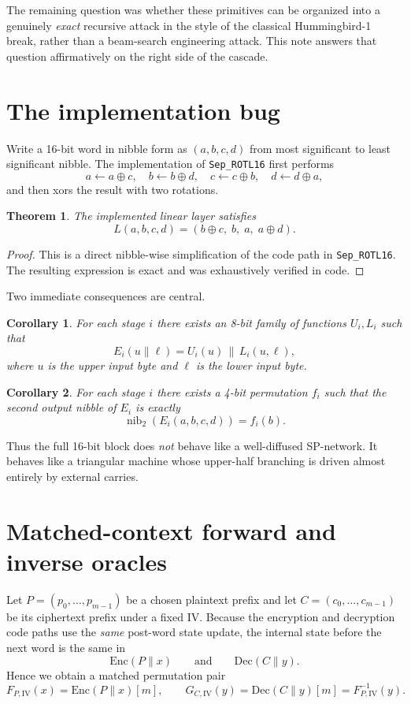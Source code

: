 \documentclass[11pt]{article}
\newtheorem{theorem}{Theorem}
\newtheorem{corollary}{Corollary}
\begin{document}
The remaining question was whether these primitives can be organized into a genuinely \emph{exact} recursive attack in the style of the classical Hummingbird-1 break, rather than a beam-search engineering attack. This note answers that question affirmatively on the right side of the cascade.

\section{The implementation bug}
Write a 16-bit word in nibble form as $(a,b,c,d)$ from most significant to least significant nibble. The implementation of \texttt{Sep\_ROTL16} first performs
\[
a\leftarrow a\oplus c,\quad
b\leftarrow b\oplus d,\quad
c\leftarrow c\oplus b,\quad
d\leftarrow d\oplus a,
\]
and then xors the result with two rotations.

\begin{theorem}
The implemented linear layer satisfies
\[
L(a,b,c,d)=(b\oplus c,\; b,\; a,\; a\oplus d).
\]
\end{theorem}

\begin{proof}
This is a direct nibble-wise simplification of the code path in \texttt{Sep\_ROTL16}. The resulting expression is exact and was exhaustively verified in code.
\end{proof}

Two immediate consequences are central.
\begin{corollary}
For each stage $i$ there exists an 8-bit family of functions $U_i,L_i$ such that
\[
E_i(u\| \ell)=U_i(u)\,\|\,L_i(u,\ell),
\]
where $u$ is the upper input byte and $\ell$ is the lower input byte.
\end{corollary}

\begin{corollary}
For each stage $i$ there exists a 4-bit permutation $f_i$ such that the second output nibble of $E_i$ is exactly
\[
\operatorname{nib}_2(E_i(a,b,c,d))=f_i(b).
\]
\end{corollary}

Thus the full 16-bit block does \emph{not} behave like a well-diffused SP-network. It behaves like a triangular machine whose upper-half branching is driven almost entirely by external carries.

\section{Matched-context forward and inverse oracles}
Let $P=(p_0,\dots,p_{m-1})$ be a chosen plaintext prefix and let $C=(c_0,\dots,c_{m-1})$ be its ciphertext prefix under a fixed IV. Because the encryption and decryption code paths use the \emph{same} post-word state update, the internal state before the next word is the same in
\[
\text{Enc}(P\|x)
\qquad\text{and}\qquad
\text{Dec}(C\|y).
\]
Hence we obtain a matched permutation pair
\[
F_{P,\mathrm{IV}}(x)=\text{Enc}(P\|x)[m],
\qquad
G_{C,\mathrm{IV}}(y)=\text{Dec}(C\|y)[m]=F_{P,\mathrm{IV}}^{-1}(y).
\]
\end{document}
